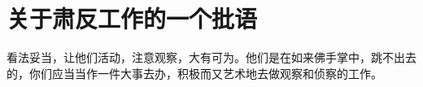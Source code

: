 \section[关于肃反工作的一个批语（一九五九年九月十八日）]{关于肃反工作的一个批语}


看法妥当，让他们活动，注意观察，大有可为。他们是在如来佛手掌中，跳不出去的，你们应当当作一件大事去办，积极而又艺术地去做观察和侦察的工作。



